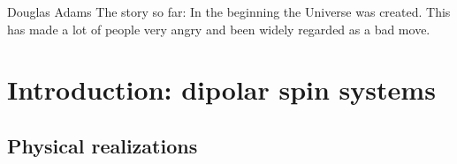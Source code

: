 \begin{tquote}{Douglas Adams}
    The story so far: In the beginning the Universe was created.
    This has made a lot of people very angry and been widely regarded as a bad move.
\end{tquote}

\chapter{Introduction: dipolar spin systems}



\section{Physical realizations}


